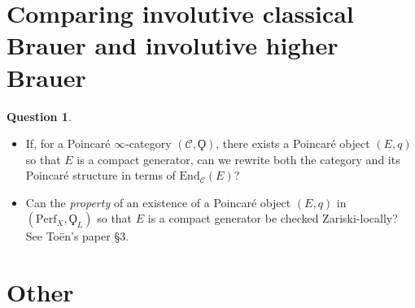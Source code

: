\documentclass{article}
\theoremstyle{definition}
\newtheorem{question}[equation]{Question}
\begin{document}
\section{Comparing involutive classical Brauer and involutive higher Brauer}
\begin{question}
\begin{itemize}
    \item If, for a Poincaré $ \infty $-category $ (\mathcal{C},\Qoppa) $, there exists a Poincaré object $(E,q) $ so that $ E $ is a compact generator, can we rewrite both the category and its Poincaré structure in terms of $ \mathrm{End}_{\mathcal{C}}(E) $? 
    \item Can the \emph{property} of an existence of a Poincaré object $ (E,q) $ in $ \left(\mathrm{Perf}_X, \Qoppa_L \right) $ so that $ E $ is a compact generator be checked Zariski-locally? 
    See Toën's paper \S3.  
\end{itemize}
\end{question}

\section{Other} 
\end{document}
